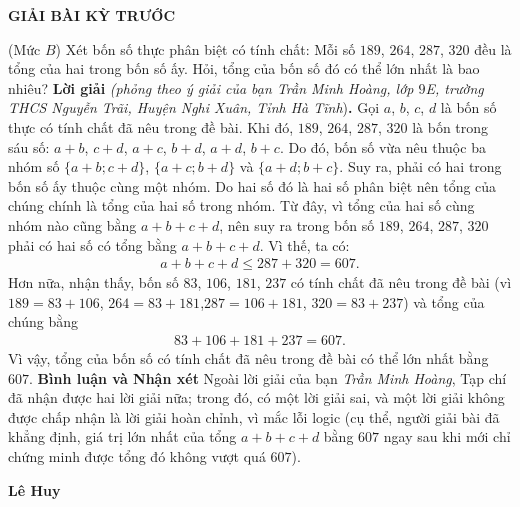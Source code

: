 \begin{center}
	{\large{\textbf{\color{thachthuctoanhoc}\color{thachthuctoanhoc}GIẢI BÀI KỲ TRƯỚC}}}
\end{center}
\begin{multicols}{2}
	\setlength{\abovedisplayskip}{4pt}
	\setlength{\belowdisplayskip}{4pt}
	{}
	(Mức $B$) Xét bốn số thực phân biệt có tính chất: Mỗi số $189$, $264$, $287$, $320$ đều là tổng của hai trong bốn số ấy. Hỏi, tổng của bốn số đó có thể lớn nhất là bao nhiêu?
	\vskip 0.05cm
	\textbf{Lời giải} \textit{(phỏng theo ý giải của bạn Trần Minh Hoàng, lớp $9$E, trường THCS Nguyễn Trãi, Huyện Nghi Xuân, Tỉnh Hà Tĩnh})\textbf{.}
	\vskip 0.05cm
	Gọi $a$, $b$, $c$, $d$ là bốn số thực có tính chất đã nêu trong đề bài.
	\vskip 0.05cm
	Khi đó, $189$, $264$, $287$, $320$ là bốn trong sáu số: $a + b$, $c + d$, $a + c$, $b + d$, $a + d$, $b + c$. Do đó, bốn số vừa nêu thuộc ba nhóm số $\{a \!+\! b; c \!+\! d\}$, $\{a \!+\! c; b \!+\! d\}$ và $\{a \!+\! d; b \!+\! c\}$. Suy ra, phải có hai trong bốn số ấy thuộc cùng một nhóm. Do hai số đó là hai số phân biệt nên tổng của chúng chính là tổng của hai số trong nhóm. Từ đây, vì tổng của hai số cùng nhóm nào cũng bằng $a + b + c + d$, nên suy ra trong bốn số $189$, $264$, $287$, $320$ phải có hai số có tổng bằng $a + b + c + d$. Vì thế, ta có:
	\begin{align*}
		a + b + c + d \le 287 + 320 = 607.
	\end{align*}
	Hơn nữa, nhận thấy, bốn số $83$, $106$, $181$, $237$ có tính chất đã nêu trong đề bài (vì $189 = 83 + 106$, $264 = 83 + 181$,\linebreak $287 = 106 + 181$, $320 = 83 + 237$) và tổng của chúng bằng
	\begin{align*}
		83 + 106 + 181 + 237 = 607.
	\end{align*}
	Vì vậy, tổng của bốn số có tính chất đã nêu trong đề bài có thể lớn nhất bằng $607$.
	\vskip 0.05cm
	\textbf{Bình luận và Nhận xét}
	\vskip 0.05cm
	Ngoài lời giải của bạn \textit{Trần Minh Hoàng}, Tạp chí đã nhận được hai lời giải nữa; trong đó, có một lời giải sai, và một lời giải không được chấp nhận là lời giải hoàn chỉnh, vì mắc lỗi logic (cụ thể, người giải bài đã khẳng định, giá trị lớn nhất của tổng $a + b + c + d$ bằng $607$ ngay sau khi mới chỉ chứng minh được tổng đó không vượt quá $607$).
	\begin{flushright}
		\textbf{Lê Huy}
	\end{flushright}
	{}

\end{multicols}

